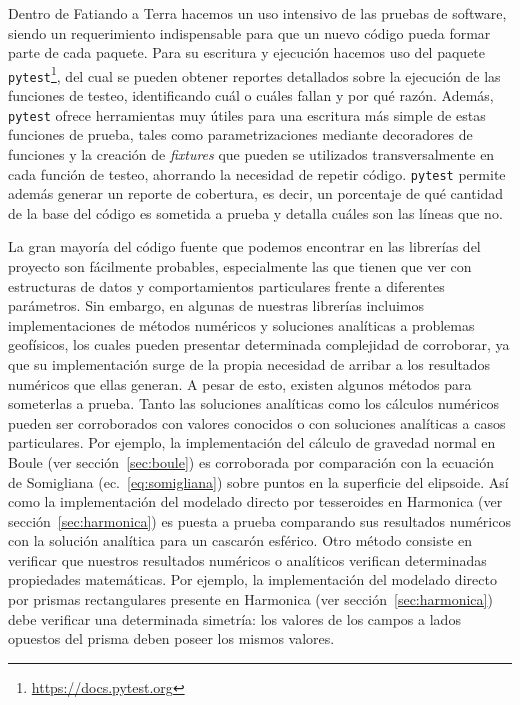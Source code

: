 Dentro de Fatiando a Terra hacemos un uso intensivo de las pruebas de software,
siendo un requerimiento indispensable para que un nuevo código pueda formar
parte de cada paquete.
Para su escritura y ejecución hacemos uso del paquete
\texttt{pytest}\footnote{\url{https://docs.pytest.org}}, del cual se pueden
obtener reportes detallados sobre la ejecución de las funciones de testeo,
identificando cuál o cuáles fallan y por qué razón.
Además, \texttt{pytest} ofrece herramientas muy útiles para una escritura más
simple de estas funciones de prueba, tales como parametrizaciones mediante
decoradores de funciones y la creación de \emph{fixtures} que pueden se
utilizados transversalmente en cada función de testeo, ahorrando la necesidad
de repetir código.
\texttt{pytest} permite además generar un reporte de cobertura, es decir, un
porcentaje de qué cantidad de la base del código es sometida a prueba y
detalla cuáles son las líneas que no.

La gran mayoría del código fuente que podemos encontrar en las librerías del
proyecto son fácilmente probables, especialmente las que tienen que ver con
estructuras de datos y comportamientos particulares frente a diferentes
parámetros.
Sin embargo, en algunas de nuestras librerías incluimos implementaciones de
métodos numéricos y soluciones analíticas a problemas geofísicos, los cuales
pueden presentar determinada complejidad de corroborar, ya que su
implementación surge de la propia necesidad de arribar a los resultados
numéricos que ellas generan.
A pesar de esto, existen algunos métodos para someterlas a prueba.
Tanto las soluciones analíticas como los cálculos numéricos pueden ser
corroborados con valores conocidos o con soluciones analíticas a casos
particulares.
Por ejemplo, la implementación del cálculo de gravedad normal en Boule (ver
sección~\ref{sec:boule}) es corroborada por comparación con la ecuación de
Somigliana (ec.~\ref{eq:somigliana}) sobre puntos en la superficie del
elipsoide.
Así como la implementación del modelado directo por tesseroides en Harmonica
(ver sección~\ref{sec:harmonica}) es puesta a prueba comparando sus resultados
numéricos con la solución analítica para un cascarón esférico.
Otro método consiste en verificar que nuestros resultados numéricos
o analíticos verifican determinadas propiedades matemáticas.
Por ejemplo, la implementación del modelado directo por prismas rectangulares
presente en Harmonica (ver sección~\ref{sec:harmonica}) debe verificar una
determinada simetría: los valores de los campos a lados opuestos del prisma
deben poseer los mismos valores.


